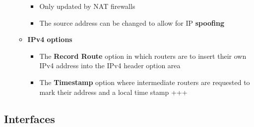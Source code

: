 \documentclass[11pt]{article}
\providecommand{\tightlist}{%
      \setlength{\itemsep}{0pt}\setlength{\parskip}{0pt}}
\begin{document}
\begin{itemize}
\begin{itemize}
    \begin{itemize}
    \tightlist
    \item
      Only updated by NAT firewalls
    \item
      The source address can be changed to allow for IP
      \textbf{spoofing}
    \end{itemize}
  \item
    \textbf{IPv4 options}

    \begin{itemize}
    \tightlist
    \item
      The \textbf{Record Route} option in which routers are to insert
      their own IPv4 address into the IPv4 header option area
    \item
      The \textbf{Timestamp} option where intermediate routers are
      requested to mark their address and a local time stamp +++
    \end{itemize}
  \end{itemize}
\end{itemize}

    \subsection{Interfaces}\label{interfaces}
\end{document}
